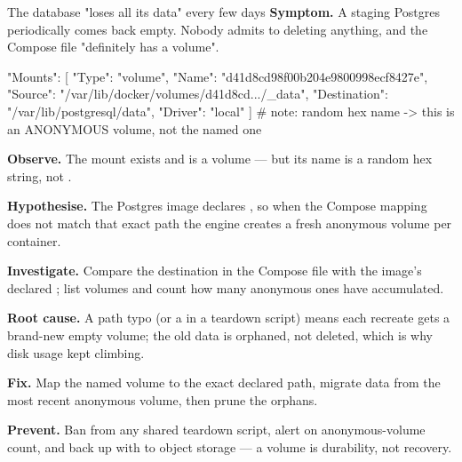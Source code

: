 \begin{debuglab}{The database "loses all its data" every few days}
\textbf{Symptom.} A staging Postgres periodically comes back empty. Nobody admits to deleting anything, and the Compose file "definitely has a volume".

\begin{outbox}
"Mounts": [
  {
    "Type": "volume",
    "Name": "d41d8cd98f00b204e9800998ecf8427e",
    "Source": "/var/lib/docker/volumes/d41d8cd.../_data",
    "Destination": "/var/lib/postgresql/data",
    "Driver": "local"
  }
]
# note: random hex name -> this is an ANONYMOUS volume, not the named one
\end{outbox}

\begin{tickcheck}
  \item \textbf{Observe.} The mount exists and is a volume --- but its name is a random hex string, not .
  \item \textbf{Hypothesise.} The Postgres image declares , so when the Compose mapping does not match that exact path the engine creates a fresh anonymous volume per container.
  \item \textbf{Investigate.} Compare the destination in the Compose file with the image's declared ; list volumes and count how many anonymous ones have accumulated.
  \item \textbf{Root cause.} A path typo (or a  in a teardown script) means each recreate gets a brand-new empty volume; the old data is orphaned, not deleted, which is why disk usage kept climbing.
  \item \textbf{Fix.} Map the named volume to the exact declared path, migrate data from the most recent anonymous volume, then prune the orphans.
  \item \textbf{Prevent.} Ban  from any shared teardown script, alert on anonymous-volume count, and back up with  to object storage --- a volume is durability, not recovery.
\end{tickcheck}
\end{debuglab}


